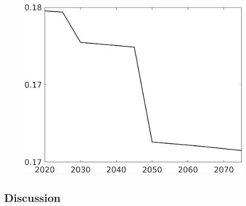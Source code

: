 \begin{figure}[h!!]
\begin{minipage}[]{0.32\textwidth}
\end{minipage}
\begin{minipage}[]{0.32\textwidth}
	\includegraphics[width=1\textwidth]{../../codding_model/own_basedOnFried/optimalPol_elastS_DisuSci/figures/all_1705/Single_OPT_T_NoTaus_Ln_spillover0_sep1_BN0_ineq0_etaa0.79.png}
\end{minipage}
\end{figure} 



\subsection{Discussion}\label{subsec:dis}

